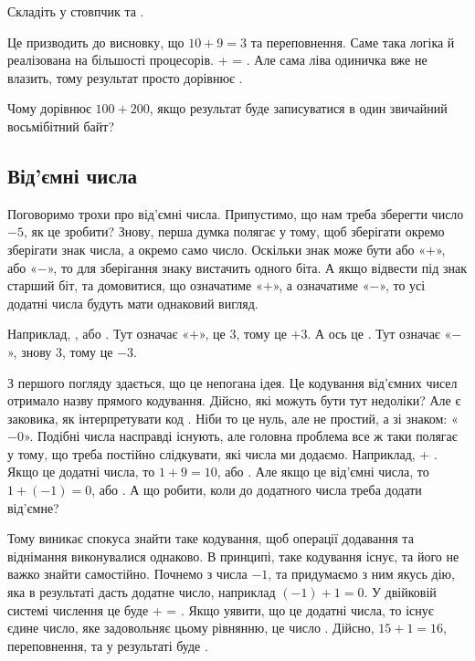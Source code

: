 \begin{exercise}
Складіть у стовпчик  та .
\end{exercise}

Це призводить до висновку, що $10 + 9 = 3$ та переповнення.
Саме така логіка й реалізована на більшості процесорів.
 +  = .
Але сама ліва одиничка вже не влазить, тому результат просто дорівнює .

\begin{exercise}
Чому дорівнює $100 + 200$, якщо результат буде записуватися в один звичайний восьмібітний байт?
\end{exercise}

\subsection{Від'ємні числа}

Поговоримо трохи про від'ємні числа.
Припустимо, що нам треба зберегти число $-5$, як це зробити?
Знову, перша думка полягає у тому, щоб зберігати окремо зберігати знак числа, а окремо само число.
Оскільки знак може бути або «$+$», або «$-$», то для зберігання знаку вистачить одного біта.
А якщо відвести під знак старший біт, та домовитися, що  означатиме «$+$», а  означатиме «$-$», то усі додатні числа будуть мати однаковий вигляд.

Наприклад, , або .
Тут  означає «$+$»,  це $3$, тому  це $+3$.
А ось  це .
Тут  означає «$-$»,  знову $3$, тому  це $-3$.

З першого погляду здається, що це непогана ідея.
Це кодування від'ємних чисел отримало назву прямого кодування.
Дійсно, які можуть бути тут недоліки?
Але є заковика, як інтерпретувати код .
Ніби то це нуль, але не простий, а зі знаком: «$-0$».
Подібні числа насправді існують, але головна проблема все ж таки полягає у тому, що треба постійно слідкувати, які числа ми додаємо.
Наприклад,  + .
Якщо це додатні числа, то $1 + 9 = 10$, або .
Але якщо це від'ємні числа, то $1 + (-1) = 0$, або .
А що робити, коли до додатного числа треба додати від'ємне?

Тому виникає спокуса знайти таке кодування, щоб операції додавання та віднімання виконувалися однаково.
В принципі, таке кодування існує, та його не важко знайти самостійно.
Почнемо з числа $-1$, та придумаємо з ним якусь дію, яка в результаті дасть додатне число, наприклад $(-1) + 1 = 0$.
У двійковій системі числення це буде  +  = .
Якщо уявити, що це додатні числа, то існує єдине число, яке задовольняє цьому рівнянню, це число .
Дійсно, $15 + 1 = 16$, переповнення, та у результаті буде .


